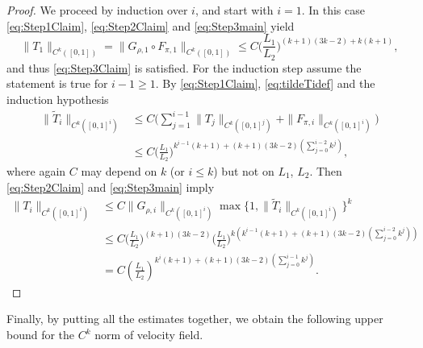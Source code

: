 \begin{proof}
  We proceed by induction over $i$, and start with $i=1$. In this case
  \eqref{eq:Step1Claim}, \eqref{eq:Step2Claim} and
  \eqref{eq:Step3main} yield
  \begin{equation*}
    \|T_1\|_{C^k([0,1])}
    =\|G_{\rho,1}\circ F_{\pi,1}\|_{C^k([0,1])}
    \le C \Big(\frac{L_1}{L_2}\Big)^{(k+1)(3k-2)+k(k+1)},
  \end{equation*}
  and thus \eqref{eq:Step3Claim} is satisfied. For the induction step
  assume the statement is true for $i-1\ge 1$. By
  \eqref{eq:Step1Claim}, \eqref{eq:tildeTidef} and the induction
  hypothesis
  \begin{align*}
    \|\tilde{T}_i\|_{C^k([0,1]^i)} &\le
    C\Bigg(
    \sum_{j=1}^{i-1}
    \|T_j\|_{C^k([0,1]^j)}
    +\|F_{\pi,i}\|_{C^k([0,1]^i)}\Bigg)\nonumber\\
    &\le
    C \Big(\frac{L_1}{L_2}\Big)^{k^{i-1}(k+1)+(k+1)(3k-2)(\sum_{j=0}^{i-2}k^j)},
  \end{align*}
  where again $C$ may depend on $k$ (or $i\le k$) but not on $L_1$,
  $L_2$.  Then \eqref{eq:Step2Claim} and \eqref{eq:Step3main} imply
  \begin{align*}
    \|T_i\|_{C^k([0,1]^i)}
    &\le C 
    \|G_{\rho,i}\|_{C^k([0,1]^i)}
      \max\{1,\|\tilde T_i\|_{C^k([0,1]^i)}\}^k\nonumber\\
    &\le C \Big(\frac{L_1}{L_2}\Big)^{(k+1)(3k-2)}
      \Big(\frac{L_1}{L_2}\Big)^{k(k^{i-1}(k+1)+(k+1)(3k-2)(\sum_{j=0}^{i-2}k^j))}\nonumber\\
    &= C\left(\frac{L_1}{L_2}\right)^{k^i(k+1)+(k+1)(3k-2)(\sum_{j=0}^{i-1}k^j)}.
  \end{align*}

\end{proof}
  
Finally, by putting all the estimates together, we obtain the following upper bound for the $C^k$ norm of velocity field. 

